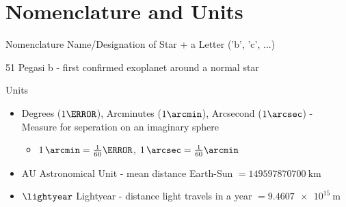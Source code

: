 \documentclass[presentation,t,aspectratio=169]{beamer}
\begin{document}
\section{Nomenclature and Units}
\begin{frame}
  \begin{block}{Nomenclature}    
    Name/Designation of Star +  a Letter ('b', 'c', ...)
  \end{block}
  \pause
  \begin{example}
    51 Pegasi b - first confirmed exoplanet around a normal star
  \end{example}
  \pause
  \begin{block}{Units}
    \begin{itemize}
    \item Degrees ($1\degree$), Arcminutes ($1\arcmin$), Arcsecond ($1\arcsec$) - Measure for seperation on an imaginary sphere
      \begin{itemize}
      \item $\SI{1}{\arcmin}= \frac{1}{60} \degree$,  $\SI{1}{\arcsec}= \frac{1}{60} \arcmin$
      \end{itemize}
    \item $\mathrm{AU}$ Astronomical Unit - mean distance Earth-Sun $= \SI{149597870700}{\km}$
    \item $\lightyear$ Lightyear - distance light travels in a year $= \SI{9.4607e15}{\meter}$
    \end{itemize}
  \end{block}
\end{frame}

\end{document}
